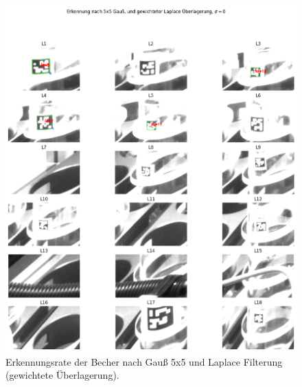     \begin{figure}
        \caption[Erkennungsrate nach Überlagerung von Gauß und Laplace Filter]{\small Erkennungsrate der Becher nach Gauß 5x5 und Laplace Filterung (gewichtete Überlagerung).}\label{fig:figure25}
        \includegraphics[width = \textwidth]{Bilder/ErkennungsrateGausLaplace.png}
        \centering
    \end{figure}

